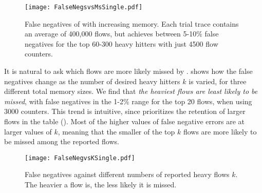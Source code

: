 \begin{figure}[ht]
\texttt{[image: FalseNegsvsMsSingle.pdf]} %
\caption{False negatives of \TheSystem with increasing memory. Each trial trace
  contains an average of 400,000 flows, but \TheSystem achieves between 5-10\%
  false negatives for the top 60-300 heavy hitters with just 4500 flow
  counters.}
\label{fig:HPNegvsM}
\end{figure}



It is natural to ask which flows
are more likely missed by \TheSystem.  shows how the false
negatives change as the number of desired heavy hitters $k$ is varied, for three
different total memory sizes. We find that {\em the heaviest flows are least
  likely to be missed}, \eg with false negatives in the 1-2\% range for the top
20 flows, when using 3000 counters. This trend is intuitive, since \TheSystem
prioritizes the retention of larger flows in the table
(). Most of the higher values of false negative errors are
at larger values of $k$, meaning that the smaller of the top $k$
flows are more likely to be missed among the reported flows.


\begin{figure}[h]
\texttt{[image: FalseNegvsKSingle.pdf]}
\caption{False negatives against different numbers of reported heavy flows
  $k$. The heavier a flow is, the less likely it is missed.}
\label{fig:falseNegvsK}
\end{figure}

